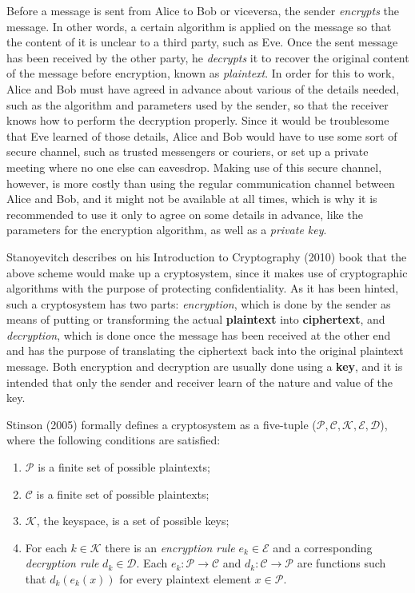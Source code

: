 Before a message is sent from Alice to Bob or viceversa, the sender \textit{encrypts} the message. In other words, a certain algorithm is applied on the message so that the content of it is unclear to a third party, such as Eve. Once the sent message has been received by the other party, he \textit{decrypts} it to recover the original content of the message before encryption, known as \textit{plaintext}. In order for this to work, Alice and Bob must have agreed in advance about various of the details needed, such as the algorithm and parameters used by the sender, so that the receiver knows how to perform the decryption properly. Since it would be troublesome that Eve learned of those details, Alice and Bob would have to use some sort of secure channel, such as trusted messengers or couriers, or set up a private meeting where no one else can eavesdrop. Making use of this secure channel, however, is more costly than using the regular communication channel between Alice and Bob, and it might not be available at all times, which is why it is recommended to use it only to agree on some details in advance, like the parameters for the encryption algorithm, as well as a \textit{private key}.

Stanoyevitch describes on his Introduction to Cryptography (2010) \cite{IntroCryptoMath} book that the above scheme would make up a cryptosystem, since it makes use of cryptographic algorithms with the purpose of protecting confidentiality. As it has been hinted, such a cryptosystem has two parts: \emph{encryption}, which is done by the sender as means of putting or transforming the actual \textbf{plaintext} into \textbf{ciphertext}, and \emph{decryption}, which is done once the message has been received at the other end and has the purpose of translating the ciphertext back into the original plaintext message. Both encryption and decryption are usually done using a \textbf{key}, and it is intended that only the sender and receiver learn of the nature and value of the key. 

Stinson (2005) \cite{stinson2005cryptography} formally defines a cryptosystem as a five-tuple ($\mathcal{P}, \mathcal{C}, \mathcal{K}, \mathcal{E}, \mathcal{D}$), where the following conditions are satisfied:
\begin{enumerate}
\item $\mathcal{P}$ is a finite set of possible plaintexts;
\item $\mathcal{C}$ is a finite set of possible plaintexts;
\item $\mathcal{K}$, the keyspace, is a set of possible keys;
\item For each $k \in \mathcal{K}$ there is an \textit{encryption rule} $ e_{k} \in \mathcal{E}$  and a corresponding \textit{decryption rule} $ d_{k} \in \mathcal{D}$. Each $e_{k}: \mathcal{P} \rightarrow \mathcal{C}$ and $d_{k}: \mathcal{C} \rightarrow \mathcal{P}$ are functions such that $d_{k}(e_{k}(x))$ for every plaintext element $x \in \mathcal{P}$.
\end{enumerate}

